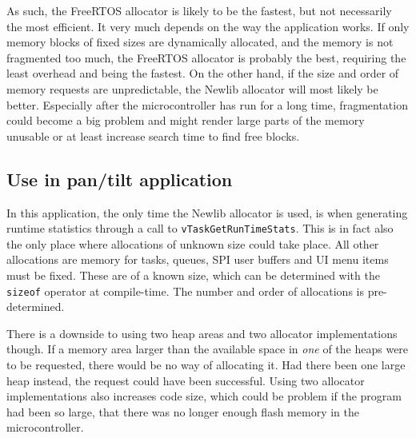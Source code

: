 As such, the FreeRTOS allocator is likely to be the fastest, but not necessarily the most efficient. It very much depends on the way the application works. If only memory blocks of fixed sizes are dynamically allocated, and the memory is not fragmented too much, the FreeRTOS allocator is probably the best, requiring the least overhead and being the fastest. On the other hand, if the size and order of memory requests are unpredictable, the Newlib allocator will most likely be better. Especially after the microcontroller has run for a long time, fragmentation could become a big problem and might render large parts of the memory unusable or at least increase search time to find free blocks.


\subsection{Use in pan/tilt application}
In this application, the only time the Newlib allocator is used, is when generating runtime statistics through a call to \texttt{vTaskGetRunTimeStats}. This is in fact also the only place where allocations of unknown size could take place. All other allocations are memory for tasks, queues, SPI user buffers and UI menu items must be fixed. These are of a known size, which can be determined with the \texttt{sizeof} operator at compile-time. The number and order of allocations is pre-determined.

There is a downside to using two heap areas and two allocator implementations though. If a memory area larger than the available space in \textit{one} of the heaps were to be requested, there would be no way of allocating it. Had there been one large heap instead, the request could have been successful. Using two allocator implementations also increases code size, which could be problem if the program had been so large, that there was no longer enough flash memory in the microcontroller.


